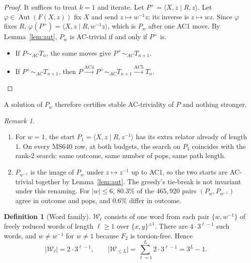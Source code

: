 \documentclass[11pt]{article}
\theoremstyle{definition}
\newtheorem{definition}[theorem]{Definition}
\theoremstyle{remark}
\newtheorem{remark}[theorem]{Remark}
\newcommand{\F}{F}
\newcommand{\pres}[2]{\langle #1 \mid #2 \rangle}
\newcommand{\Aut}{\operatorname{Aut}}
\newcommand{\W}{\mathcal{W}}
\begin{document}
\begin{proof}
It suffices to treat $k=1$ and iterate. Let $P^{+}=\pres{X,z}{R,z}$. Let $\varphi\in\Aut(\F(X,z))$ fix $X$ and send
$z\mapsto w^{-1}z$; its inverse is $z\mapsto wz$. Since $\varphi$ fixes $R$, $\varphi(P^{+})=\pres{X,z}{R,w^{-1}z}$,
which is $P_w$ after one AC1 move. By Lemma~\ref{lem:aut}, $P_w$ is AC-trivial if and only if $P^{+}$ is.
\begin{itemize}
  \item If $P\sim_{AC}T_n$, the same moves give $P^{+}\sim_{AC}T_{n+1}$.
  \item If $P^{+}\sim_{AC}T_{n+1}$, then $P\xrightarrow{\mathrm{AC4}}P^{+}\sim_{AC}T_{n+1}\xrightarrow{\mathrm{AC5}}T_n$.
\end{itemize}
\end{proof}

A solution of $P_w$ therefore certifies stable AC-triviality of $P$ and nothing stronger.

\begin{remark}
\begin{enumerate}
  \item For $w=1$, the start $P_1=\pres{X,z}{R,z^{-1}}$ has its extra relator already of length $1$. On every MS640
  row, at both budgets, the search on $P_1$ coincides with the rank-2 search: same outcome, same number of pops, same
  path length.
  \item $P_{w^{-1}}$ is the image of $P_w$ under $z\mapsto z^{-1}$ up to AC1, so the two starts are AC-trivial together
  by Lemma~\ref{lem:aut}. The greedy's tie-break is not invariant under this renaming. For $|w|\le6$, $80.3\%$ of the
  $465{,}920$ pairs $(P_w,P_{w^{-1}})$ agree in outcome and pops, and $0.6\%$ differ in outcome.
\end{enumerate}
\end{remark}

\begin{definition}[Word family]
$\W_\ell$ consists of one word from each pair $\{w,w^{-1}\}$ of freely reduced words of length $\ell\ge1$ over
$\{x,y\}^{\pm1}$. There are $4\cdot3^{\ell-1}$ such words, and $w\neq w^{-1}$ for $w\neq1$ because $\F_2$ is
torsion-free. Hence
\[
|\W_\ell|=2\cdot3^{\ell-1},\qquad \Big|\W_{\le L}\Big|=\sum_{\ell=1}^{L}2\cdot3^{\ell-1}=3^{L}-1.
\]
\end{definition}
\end{document}
